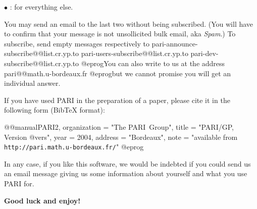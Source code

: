  $\bullet$ : for everything else.

\noindent You may send an email to the last two without being subscribed.
(You will have to confirm that your message is not unsollicited bulk email,
aka \emph{Spam}.) To subscribe, send empty messages respectively to
\def\@{@}
\bprog
  pari-announce-subscribe@@list.cr.yp.to
     pari-users-subscribe@@list.cr.yp.to
       pari-dev-subscribe@@list.cr.yp.to
@eprog\noindent You can also write to us at the address
\bprog
  pari@@math.u-bordeaux.fr
@eprog\noindent but we cannot promise you will get an individual answer.
\smallskip

If you have used PARI in the preparation of a paper, please cite it in the
following form (BibTeX format):

\bprog
@@manual{PARI2,
    organization = "{The PARI~Group}",
    title        = "{PARI/GP, Version @vers}",
    year         = 2004,
    address      = "Bordeaux",
    note         = "available from {\tt http://pari.math.u-bordeaux.fr/}"
}
@eprog
\smallskip

\noindent In any case, if you like this software, we would be indebted if you
could send us an email message giving us some information about yourself and
what you use PARI for.

\medskip
{\bf Good luck and enjoy!}
\vfill\eject
